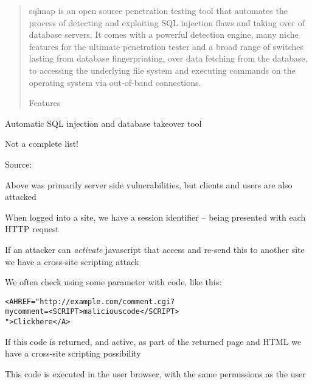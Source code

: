 \documentclass[Screen16to9,17pt]{foils}
\begin{document}
\begin{quote}\small
sqlmap is an open source penetration testing tool that automates the process of detecting and exploiting SQL injection flaws and taking over of database servers. It comes with a powerful detection engine, many niche features for the ultimate penetration tester and a broad range of switches lasting from database fingerprinting, over data fetching from the database, to accessing the underlying file system and executing commands on the operating system via out-of-band connections.

Features
\end{quote}

\begin{list1}
\item Automatic SQL injection and database takeover tool
\end{list1}




Not a complete list!

Source: 


Above was primarily server side vulnerabilities, but clients and users are also attacked

\begin{list1}
\item When logged into a site, we have a session identifier -- being presented with each HTTP request
\item If an attacker can \emph{activate} javascript that access and re-send this to another site we have a cross-site scripting attack
\item We often check using some parameter with code, like this:
\begin{alltt}
<A HREF="http://example.com/comment.cgi?
mycomment=<SCRIPT>malicious code</SCRIPT>
">Click here</A>
\end{alltt}
\item If this code is returned, and active, as part of the returned page and HTML we have a cross-site scripting possibility
\item This code is executed in the user browser, with the same permissions as the user
\end{list1}


\end{document}

